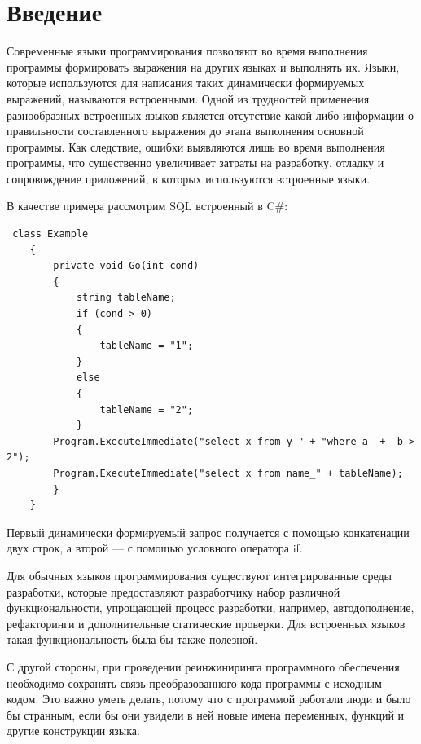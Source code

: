 \section*{Введение}
Современные языки программирования позволяют во время выполнения программы формировать выражения на других языках и выполнять их. 
Языки, которые используются для написания таких динамически формируемых выражений, называются встроенными. 
Одной из трудностей  применения разнообразных встроенных языков является отсутствие  какой-либо информации о правильности 
составленного выражения до этапа выполнения основной программы. Как следствие, ошибки выявляются лишь во время выполнения программы, 
что существенно увеличивает затраты на разработку, отладку и сопровождение приложений, в которых используются встроенные языки. 

В качестве примера рассмотрим SQL встроенный в C\#:

\begin{verbatim}
 class Example
    {
        private void Go(int cond)
        {
            string tableName;
            if (cond > 0)
            {
                tableName = "1";
            }
            else
            {
                tableName = "2";
            }
        Program.ExecuteImmediate("select x from y " + "where a  +  b > 2");
        Program.ExecuteImmediate("select x from name_" + tableName);
        }
    }
\end{verbatim}

Первый динамически формируемый запрос получается с помощью конкатенации двух строк, а второй --- с помощью условного оператора if.

Для обычных языков программирования существуют интегрированные среды разработки, которые предоставляют разработчику набор различной 
функциональности, упрощающей процесс разработки, например, автодополнение, рефакторинги и дополнительные статические проверки.
Для встроенных языков такая функциональность была бы также полезной.

С другой стороны, при проведении реинжиниринга программного обеспечения необходимо сохранять связь преобразованного кода программы
с исходным кодом.  Это важно уметь делать, потому что с  программой работали люди и было бы странным, если бы они увидели в ней новые 
имена переменных, функций и другие конструкции языка.  

